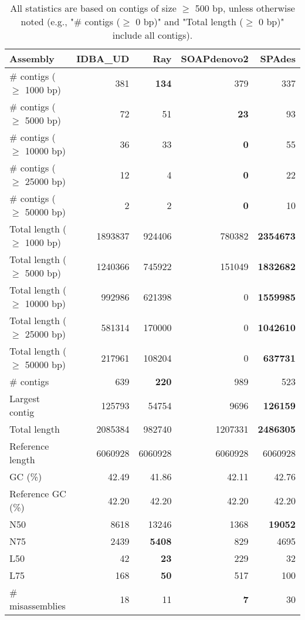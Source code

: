 \documentclass[12pt,a4paper]{article}
\begin{document}
\begin{table}[ht]
\begin{center}
\caption{All statistics are based on contigs of size $\geq$ 500 bp, unless otherwise noted (e.g., "\# contigs ($\geq$ 0 bp)" and "Total length ($\geq$ 0 bp)" include all contigs).}
\begin{tabular}{|l*{4}{|r}|}
\hline
Assembly & IDBA\_UD & Ray & SOAPdenovo2 & SPAdes \\ \hline
\# contigs ($\geq$ 1000 bp) & 381 & {\bf 134} & 379 & 337 \\ \hline
\# contigs ($\geq$ 5000 bp) & 72 & 51 & {\bf 23} & 93 \\ \hline
\# contigs ($\geq$ 10000 bp) & 36 & 33 & {\bf 0} & 55 \\ \hline
\# contigs ($\geq$ 25000 bp) & 12 & 4 & {\bf 0} & 22 \\ \hline
\# contigs ($\geq$ 50000 bp) & 2 & 2 & {\bf 0} & 10 \\ \hline
Total length ($\geq$ 1000 bp) & 1893837 & 924406 & 780382 & {\bf 2354673} \\ \hline
Total length ($\geq$ 5000 bp) & 1240366 & 745922 & 151049 & {\bf 1832682} \\ \hline
Total length ($\geq$ 10000 bp) & 992986 & 621398 & 0 & {\bf 1559985} \\ \hline
Total length ($\geq$ 25000 bp) & 581314 & 170000 & 0 & {\bf 1042610} \\ \hline
Total length ($\geq$ 50000 bp) & 217961 & 108204 & 0 & {\bf 637731} \\ \hline
\# contigs & 639 & {\bf 220} & 989 & 523 \\ \hline
Largest contig & 125793 & 54754 & 9696 & {\bf 126159} \\ \hline
Total length & 2085384 & 982740 & 1207331 & {\bf 2486305} \\ \hline
Reference length & 6060928 & 6060928 & 6060928 & 6060928 \\ \hline
GC (\%) & 42.49 & 41.86 & 42.11 & 42.76 \\ \hline
Reference GC (\%) & 42.20 & 42.20 & 42.20 & 42.20 \\ \hline
N50 & 8618 & 13246 & 1368 & {\bf 19052} \\ \hline
N75 & 2439 & {\bf 5408} & 829 & 4695 \\ \hline
L50 & 42 & {\bf 23} & 229 & 32 \\ \hline
L75 & 168 & {\bf 50} & 517 & 100 \\ \hline
\# misassemblies & 18 & 11 & {\bf 7} & 30 \\ \hline

\end{tabular}
\end{center}
\end{table}
\end{document}
